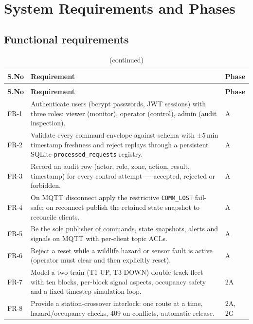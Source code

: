 \chapter{System Requirements and Phases}\label{cha:requirements}

\section{Functional requirements}

\begin{longtable}{>{\raggedright}p{0.8cm} >{\raggedright\arraybackslash}p{10.6cm} l}
\caption{Functional requirements and delivery phase}\label{tab:functional}\\
\toprule
\textbf{S.No} & \textbf{Requirement} & \textbf{Phase} \\
\midrule
\endfirsthead
\caption[]{(continued)}\\
\toprule
\textbf{S.No} & \textbf{Requirement} & \textbf{Phase} \\
\midrule
\endhead
FR-1 & Authenticate users (bcrypt passwords, JWT sessions) with three roles: viewer (monitor), operator (control), admin (audit inspection). & A \\
FR-2 & Validate every command envelope against schema with $\pm$5\,min timestamp freshness and reject replays through a persistent SQLite \texttt{processed\_requests} registry. & A \\
FR-3 & Record an audit row (actor, role, zone, action, result, timestamp) for every control attempt --- accepted, rejected or forbidden. & A \\
FR-4 & On MQTT disconnect apply the restrictive \texttt{COMM\_LOST} fail-safe; on reconnect publish the retained state snapshot to reconcile clients. & A \\
FR-5 & Be the sole publisher of commands, state snapshots, alerts and signals on MQTT with per-client topic ACLs. & A \\
FR-6 & Reject a reset while a wildlife hazard or sensor fault is active (operator must clear and then explicitly reset). & A \\
FR-7 & Model a two-train (T1 UP, T3 DOWN) double-track fleet with ten blocks, per-block signal aspects, occupancy safety and a fixed-timestep simulation loop. & 2A \\
FR-8 & Provide a station-crossover interlock: one route at a time, hazard/occupancy checks, 409 on conflicts, automatic release. & 2A, 2G \\

\end{longtable}
